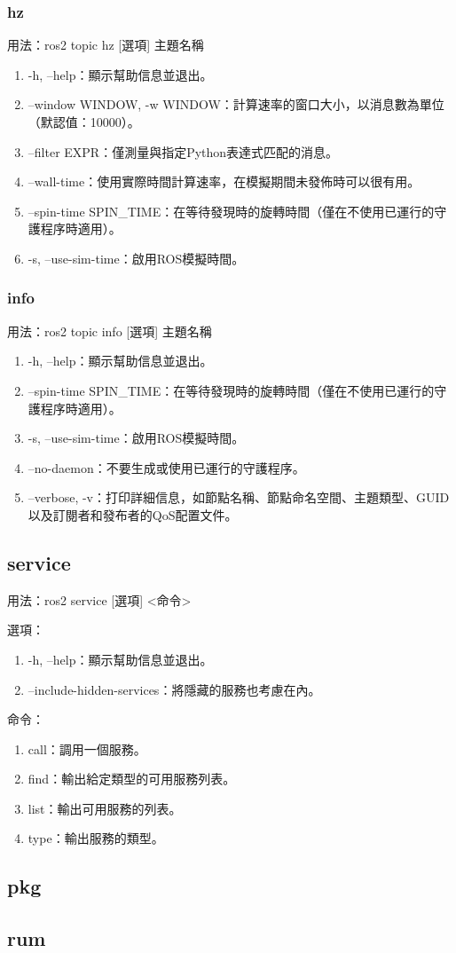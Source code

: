 \subsubsection{hz}
用法：ros2 topic hz [選項] 主題名稱
\begin{enumerate}
    \item -h, --help：顯示幫助信息並退出。
    \item --window WINDOW, -w WINDOW：計算速率的窗口大小，以消息數為單位（默認值：10000）。
    \item --filter EXPR：僅測量與指定Python表達式匹配的消息。
    \item --wall-time：使用實際時間計算速率，在模擬期間未發佈時可以很有用。
    \item --spin-time SPIN\_TIME：在等待發現時的旋轉時間（僅在不使用已運行的守護程序時適用）。
    \item -s, --use-sim-time：啟用ROS模擬時間。
\end{enumerate}
\subsubsection{info}
用法：ros2 topic info [選項] 主題名稱

\begin{enumerate}
    \item -h, --help：顯示幫助信息並退出。
    \item --spin-time SPIN\_TIME：在等待發現時的旋轉時間（僅在不使用已運行的守護程序時適用）。
    \item -s, --use-sim-time：啟用ROS模擬時間。
    \item --no-daemon：不要生成或使用已運行的守護程序。
    \item --verbose, -v：打印詳細信息，如節點名稱、節點命名空間、主題類型、GUID以及訂閱者和發布者的QoS配置文件。
\end{enumerate}

\subsection{service}
用法：ros2 service [選項] <命令>

選項：
\begin{enumerate}
    \item -h, --help：顯示幫助信息並退出。
    \item --include-hidden-services：將隱藏的服務也考慮在內。
\end{enumerate}
命令：
\begin{enumerate}
    \item call：調用一個服務。
    \item find：輸出給定類型的可用服務列表。
    \item list：輸出可用服務的列表。
    \item type：輸出服務的類型。
\end{enumerate}
\subsection{pkg}
\subsection{rum}
